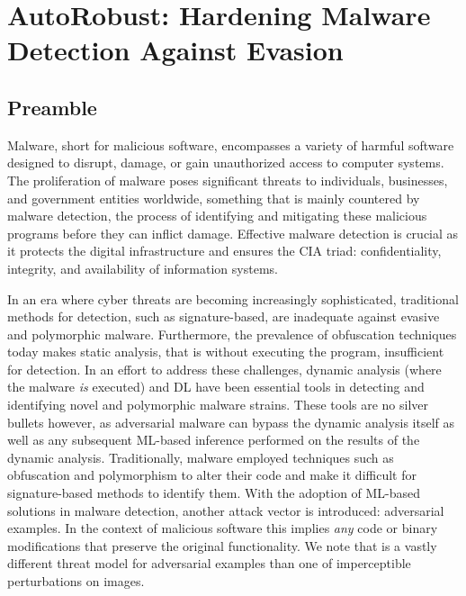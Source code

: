 \chapter{AutoRobust: Hardening Malware Detection Against Evasion}\label{ch:autorobust}
\label{ch:autorobust}
\section*{Preamble}

Malware, short for malicious software, encompasses a variety of harmful software designed to disrupt, damage, or gain unauthorized access to computer systems.
The proliferation of malware poses significant threats to individuals, businesses, and government entities worldwide, something that is mainly countered by malware detection, the process of identifying and mitigating these malicious programs before they can inflict damage.
Effective malware detection is crucial as it protects the digital infrastructure and ensures the CIA triad: confidentiality, integrity, and availability of information systems.

In an era where cyber threats are becoming increasingly sophisticated, traditional methods for detection, such as signature-based, are inadequate against evasive and polymorphic malware.
Furthermore, the prevalence of obfuscation techniques today makes static analysis, that is without executing the program, insufficient for detection.
In an effort to address these challenges, dynamic analysis (where the malware \textit{is} executed) and \gls{DL} have been essential tools in detecting and identifying novel and polymorphic malware strains.
These tools are no silver bullets however, as adversarial malware can bypass the dynamic analysis itself as well as any subsequent ML-based inference performed on the results of the dynamic analysis.
Traditionally, malware employed techniques such as obfuscation and polymorphism to alter their code and make it difficult for signature-based methods to identify them.
With the adoption of ML-based solutions in malware detection,
another attack vector is introduced: adversarial examples.
In the context of malicious software this implies \textit{any} code or binary modifications that preserve the original functionality.
We note that is a vastly different threat model for adversarial examples than one of imperceptible perturbations on images.

